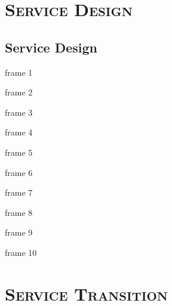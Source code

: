 \documentclass[xcolor=x11names,compress]{beamer}
\renewcommand{\(}{\begin{columns}}
\renewcommand{\)}{\end{columns}}
\newcommand{\<}[1]{\begin{column}{#1}}
\renewcommand{\>}{\end{column}}
\begin{document}
\section{\scshape Service Design}
\subsection{Service Design}
\begin{frame}{frame 1}

\end{frame}
\begin{frame}{frame 2}

\end{frame}
\begin{frame}{frame 3}

\end{frame}
\begin{frame}{frame 4}

\end{frame}
\begin{frame}{frame 5}

\end{frame}
\begin{frame}{frame 6}

\end{frame}
\begin{frame}{frame 7}

\end{frame}
\begin{frame}{frame 8}

\end{frame}
\begin{frame}{frame 9}

\end{frame}
\begin{frame}{frame 10}

\end{frame}
\section{\scshape Service Transition}
\end{document}
